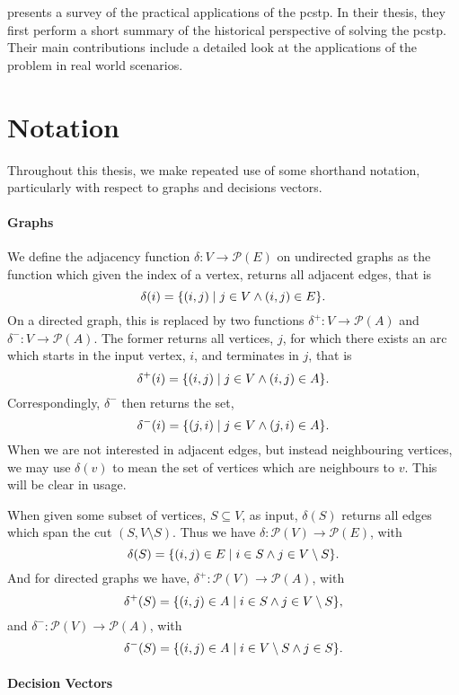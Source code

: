 \citet*{sun2018classical} presents a survey of the practical applications of the \gls{pcstp}.
In their thesis, they first perform a short summary of the historical perspective of
solving the \gls{pcstp}. Their main contributions include
a detailed look at the applications
of the problem in real world scenarios.

\section{Notation}\label{sec:intro:notation}

Throughout this thesis, we make repeated use of some shorthand notation, particularly
with respect to graphs and decisions vectors.

\paragraph{Graphs}

We define the adjacency function $\delta : V \to \mathcal{P} (E)$ on undirected graphs as
the function which given the index of a vertex, returns all adjacent edges, that is
\[\delta(i) = \{(i,j) \mid j \in V \wedge (i, j) \in E\}\mathnormal{.}\]
On a directed graph, this is replaced by two functions
$\delta^+ : V \to \mathcal{P} (A)$
and $\delta^-: V \to \mathcal{P} (A)$.
The former returns all vertices, $j$, for which there exists an arc
which starts in the input vertex, $i$, and terminates in $j$, that is
\[\delta^+(i) = \{(i, j) \mid j \in V \wedge (i, j) \in A\}\mathnormal{.}\]
Correspondingly, $\delta^-$ then returns the set,
\[\delta^-(i) = \{(j, i) \mid j \in V \wedge (j, i) \in A\}\mathnormal{.}\]
When we are not interested in adjacent edges, but instead neighbouring vertices,
we may use $\delta(v)$ to mean the set of vertices which are neighbours to $v$.
This will be clear in usage.


When given some subset of vertices, $S \subseteq V$, as input,
$\delta(S)$ returns all edges which span the cut $(S, V \setminus S)$.
Thus we have $\delta : \mathcal{P}(V) \to \mathcal{P}(E)$, with
\[\delta(S) = \{(i,j) \in E \mid i \in S \wedge j \in V \setminus S\}\mathnormal{.}\]
And for directed graphs we have, $\delta^+ : \mathcal{P}(V) \to \mathcal{P}(A)$, with
\[\delta^+(S) = \{(i,j) \in A \mid i \in S \wedge j \in V \setminus S\}\mathnormal{,}\]
and $\delta^- : \mathcal{P}(V) \to \mathcal{P}(A)$, with
\[\delta^-(S) = \{(i,j) \in A \mid i \in V \setminus S \wedge j \in S\}\mathnormal{.}\]

\paragraph{Decision Vectors}

